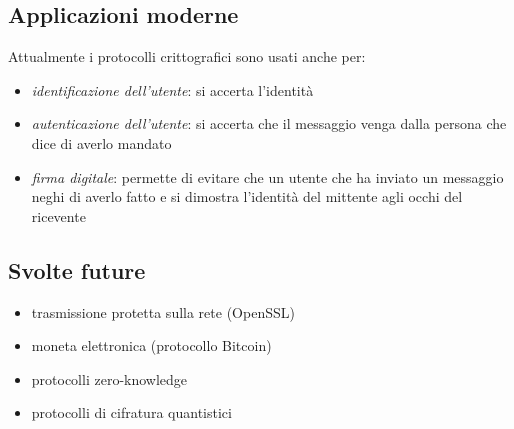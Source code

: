 \subsection{Applicazioni moderne}
Attualmente i protocolli crittografici sono usati anche per:
\begin{itemize}
    \item \emph{identificazione dell'utente}: si accerta l'identità
    \item \emph{autenticazione dell'utente}: si accerta che il messaggio venga dalla persona che dice di averlo mandato
    \item \emph{firma digitale}: permette di evitare che un utente che ha inviato un messaggio neghi di averlo fatto e si dimostra l'identità del mittente agli occhi del ricevente
\end{itemize}

\subsection{Svolte future}
\begin{itemize}
    \item trasmissione protetta sulla rete (OpenSSL)
    \item moneta elettronica (protocollo Bitcoin)
    \item protocolli zero-knowledge
    \item protocolli di cifratura quantistici
\end{itemize}